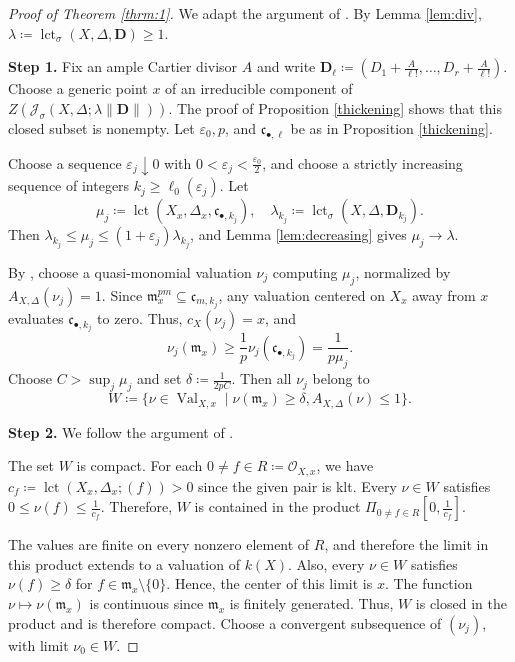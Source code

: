 \documentclass[a4paper,12pt]{amsart}
\theoremstyle{plain}
\theoremstyle{definition}
\numberwithin{equation}{section}
\newcommand{\OO}{\mathcal{O}}
\DeclareMathOperator{\Val}{Val}
\def\lct{\operatorname{lct}}
\begin{document}
\begin{proof}[Proof of Theorem \ref{thrm:1}]
We adapt the argument of \cite[Proof of Theorem 1.1]{CJKL}. By Lemma \ref{lem:div}, $\lambda\coloneqq \lct_{\sigma}(X,\Delta,\mathbf{D})\geq 1$. 

\smallskip

\noindent\textbf{Step 1.} Fix an ample Cartier divisor $A$ and write $\mathbf{D}_{\ell}\coloneqq (D_1+\frac{A}{\ell!},\dots,D_r+\frac{A}{\ell!})$. Choose a generic point $x$ of an irreducible component of $Z(\mathcal{J}_{\sigma}(X,\Delta;\lambda\|\mathbf{D}\|))$. The proof of Proposition \ref{thickening} shows that this closed subset is nonempty. Let $\varepsilon_0,p$, and $\mathfrak{c}_{\bullet,\ell}$ be as in Proposition \ref{thickening}.

Choose a sequence $\varepsilon_j\downarrow 0$ with $0<\varepsilon_j<\frac{\varepsilon_0}{2}$, and choose a strictly increasing sequence of integers $k_j\geq \ell_0(\varepsilon_j)$. Let
\[
\mu_j\coloneqq \lct(X_x,\Delta_x,\mathfrak{c}_{\bullet,k_j}),\quad \lambda_{k_j}\coloneqq \lct_{\sigma}(X,\Delta,\mathbf{D}_{k_j}).
\]
Then $\lambda_{k_j}\leq \mu_j\leq (1+\varepsilon_j)\lambda_{k_j}$, and Lemma \ref{lem:decreasing} gives $\mu_j\to \lambda$.

By \cite[Theorem 1.1]{Xu20}, choose a quasi-monomial valuation $\nu_j$ computing $\mu_j$, normalized by $A_{X,\Delta}(\nu_j)=1$. Since $\mathfrak{m}_x^{pm}\subseteq \mathfrak{c}_{m,k_j}$, any valuation centered on $X_x$ away from $x$ evaluates $\mathfrak{c}_{\bullet,k_j}$ to zero. Thus, $c_X(\nu_j)=x$, and
\begin{equation}
    \nu_j(\mathfrak{m}_x)\geq \frac{1}{p}\nu_j(\mathfrak{c}_{\bullet,k_j})=\frac{1}{p\mu_j}.
\end{equation}
Choose $C>\sup_j \mu_j$ and set $\delta\coloneqq \frac{1}{2pC}$. Then all $\nu_j$ belong to
\[
W\coloneqq \{\nu\in \Val_{X,x}\mid \nu(\mathfrak{m}_x)\geq \delta, A_{X,\Delta}(\nu)\leq 1\}.
\]

\noindent\textbf{Step 2.} 
We follow the argument of \cite[Proposition 5.9]{JM12}. 

The set $W$ is compact. For each $0\neq f\in R\coloneqq \OO_{X,x}$, we have $c_f\coloneqq \lct(X_x,\Delta_x;(f))>0$ since the given pair is klt. Every $\nu\in W$ satisfies $0\leq \nu(f)\leq \frac{1}{c_f}$. Therefore, $W$ is contained in the product $\Pi_{0\neq f\in R} [0,\frac{1}{c_f}]$.

The values are finite on every nonzero element of $R$, and therefore the limit in this product extends to a valuation of $k(X)$. Also, every $\nu\in W$ satisfies $\nu(f)\geq \delta$ for $f\in \mathfrak{m}_x\setminus \{0\}$. Hence, the center of this limit is $x$. The function $\nu\mapsto \nu(\mathfrak{m}_x)$ is continuous since $\mathfrak{m}_x$ is finitely generated. Thus, $W$ is closed in the product and is therefore compact. Choose a convergent subsequence of $(\nu_j)$, with limit $\nu_0\in W$.


\end{proof}
\end{document}
